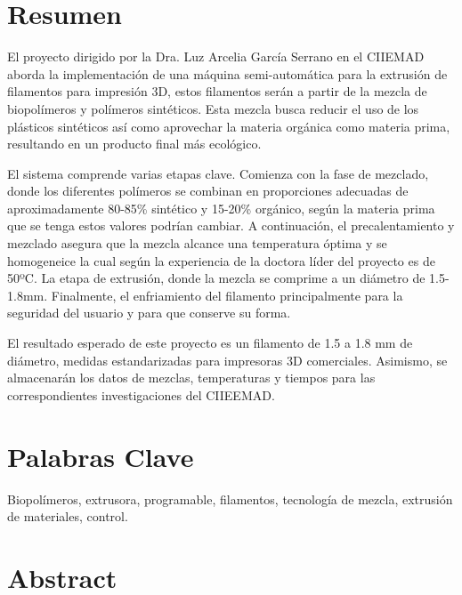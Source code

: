 \documentclass[14pt,oneside]{extarticle} %
\renewcommand{\normalsize}{\fontsize{13.5}{17}\selectfont} %
\begin{document}
\newpage

\fancyhead{}
\fancyfoot[R]{\thepage}
\renewcommand{\headrulewidth}{2pt}
\renewcommand{\footrulewidth}{2pt}
\normalsize

\newpage
\tableofcontents
\newpage
\listoftables
\listoffigures
\clearpage

\section{Resumen}

El proyecto dirigido por la Dra. Luz Arcelia García Serrano en el CIIEMAD aborda la implementación de una máquina semi-automática para la extrusión de filamentos para impresión 3D, estos filamentos serán a partir de la mezcla de biopolímeros y polímeros sintéticos. Esta mezcla busca reducir el uso de los plásticos sintéticos así como aprovechar la materia orgánica como materia prima, resultando en un producto final más ecológico.

El sistema comprende varias etapas clave. Comienza con la fase de mezclado, donde los diferentes polímeros se combinan en proporciones adecuadas de aproximadamente 80-85\% sintético y 15-20\% orgánico, según la materia prima que se tenga estos valores podrían cambiar. A continuación, el precalentamiento y mezclado asegura que la mezcla alcance una temperatura óptima y se homogeneice la cual según la experiencia de la doctora líder del proyecto es de 50ºC. La etapa de extrusión, donde la mezcla se comprime a un diámetro de 1.5-1.8mm. Finalmente, el enfriamiento del filamento principalmente para la seguridad del usuario y para que conserve su forma.

El resultado esperado de este proyecto es un filamento de 1.5 a 1.8 mm de diámetro, medidas estandarizadas para impresoras 3D comerciales. Asimismo, se almacenarán los datos de mezclas, temperaturas y tiempos para las correspondientes investigaciones  del CIIEEMAD. 

\section{Palabras Clave}

Biopolímeros, extrusora, programable, filamentos, tecnología de mezcla, extrusión de materiales, control.

\newpage
\section{Abstract}
\end{document}
